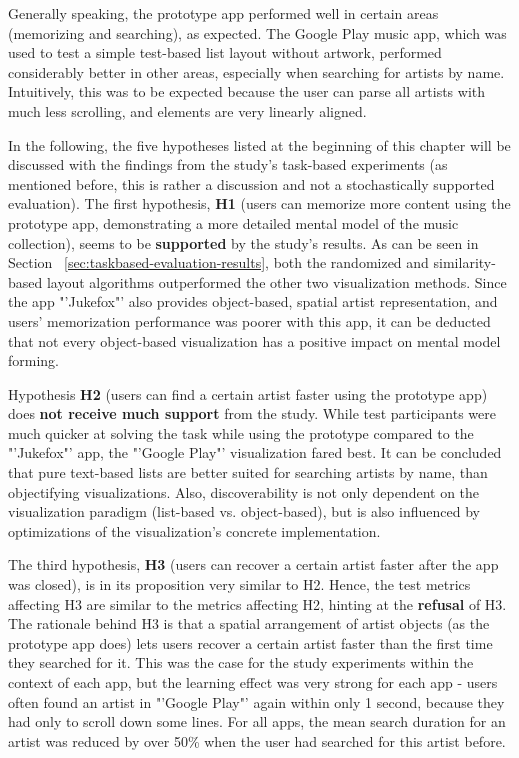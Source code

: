 Generally speaking, the prototype app performed well in certain areas (memorizing and searching), as expected. The Google Play music app, which was used to test a simple test-based list layout without artwork, performed considerably better in other areas, especially when searching for artists by name. Intuitively, this was to be expected because the user can parse all artists with much less scrolling, and elements are very linearly aligned.

In the following, the five hypotheses listed at the beginning of this chapter will be discussed with the findings from the study's task-based experiments (as mentioned before, this is rather a discussion and not a stochastically supported evaluation).
The first hypothesis, \textbf{H1} (users can memorize more content using the prototype app, demonstrating a more detailed mental model of the music collection), seems to be \textbf{supported} by the study's results. As can be seen in Section ~\ref{sec:taskbased-evaluation-results}, both the randomized and similarity-based layout algorithms outperformed the other two visualization methods. Since the app "'Jukefox"' also provides object-based, spatial artist representation, and users' memorization performance was poorer with this app, it can be deducted that not every object-based visualization has a positive impact on mental model forming.

Hypothesis \textbf{H2} (users can find a certain artist faster using the prototype app) does \textbf{not receive much support} from the study. While test participants were much quicker at solving the task while using the prototype compared to the "'Jukefox"' app, the "'Google Play"' visualization fared best. It can be concluded that pure text-based lists are better suited for searching artists by name, than objectifying visualizations. Also, discoverability is not only dependent on the visualization paradigm (list-based vs. object-based), but is also influenced by optimizations of the visualization's concrete implementation.
 
The third hypothesis, \textbf{H3} (users can recover a certain artist faster after the app was closed), is in its proposition very similar to H2. Hence, the test metrics affecting H3 are similar to the metrics affecting H2, hinting at the \textbf{refusal} of H3. The rationale behind H3 is that a spatial arrangement of artist objects (as the prototype app does) lets users recover a certain artist faster than the first time they searched for it. This was the case for the study experiments within the context of each app, but the learning effect was very strong for each app - users often found an artist in "'Google Play"' again within only 1 second, because they had only to scroll down some lines. For all apps, the mean search duration for an artist was reduced by over 50\% when the user had searched for this artist before.


